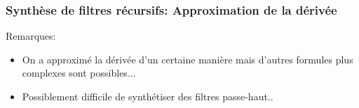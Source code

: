 \documentclass{beamer}
\begin{document}
\begin{frame}
{\begin{columns}
\begin{center}
\end{center}

\end{columns}

}

\end{frame}

\begin{frame}
\frametitle{Synthèse de filtres récursifs: Approximation de la dérivée}
Remarques:\\
\vspace{0.1cm}
\begin{itemize}
\item On a approximé la dérivée d'un certaine manière mais d'autres formules plus complexes sont possibles...
\vspace{0.2cm} 
\item Possiblement difficile de synthétiser des filtres passe-haut.. 
\end{itemize}
\label{rajouter passe haut si le temps le permet}
\end{frame}
\end{document}
